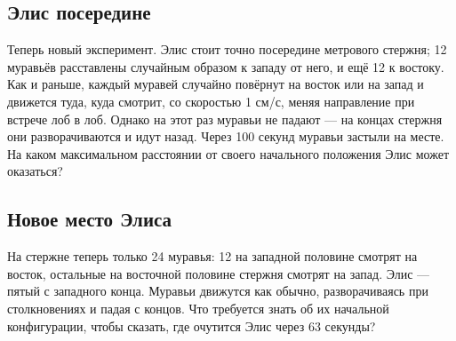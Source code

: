 \subsection*{Элис посередине}

Теперь новый эксперимент.
Элис стоит точно посередине метрового стержня; 12 муравьёв расставлены случайным образом к западу от него, и ещё 12 к востоку.
Как и раньше, каждый муравей случайно повёрнут на восток или на запад и движется туда, куда смотрит, со скоростью 1 см/с, меняя направление при встрече лоб в лоб.
Однако на этот раз муравьи не падают ---
на концах стержня они разворачиваются и идут назад.
Через 100 секунд муравьи застыли на месте.
На каком максимальном расстоянии от своего начального положения Элис может оказаться?

\subsection*{Новое место Элиса}

На стержне теперь только 24 муравья:
12 на западной половине смотрят на восток,
остальные на восточной половине стержня смотрят на запад.
Элис --- пятый с западного конца.
Муравьи движутся как обычно, разворачиваясь при столкновениях и падая с концов.
Что требуется знать об их начальной конфигурации, чтобы сказать, где очутится Элис через 63 секунды?
